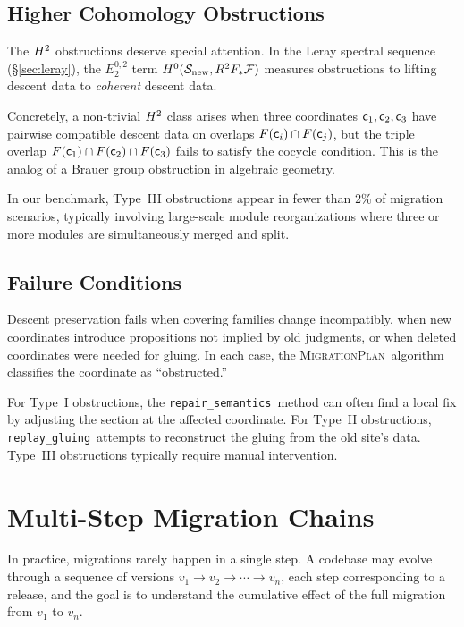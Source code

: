 \documentclass[11pt]{article}
\newcommand{\MigPlan}{\textsc{MigrationPlan}}
\newcommand{\ReplayGlue}{\texttt{replay\_gluing}}
\newcommand{\RepairSem}{\texttt{repair\_semantics}}
\newcommand{\SiteNew}{\Site_{\mathrm{new}}}
\newcommand{\FunctorF}{F}
\newcommand{\Pushforward}{F_*}
\begin{document}
\subsection{Higher Cohomology Obstructions}\label{sec:higher-obstructions}

The $H^{2}$ obstructions deserve special attention.  In the Leray
spectral sequence (§\ref{sec:leray}), the $E_2^{0,2}$ term
$\Hcoh{0}(\SiteNew, R^2\Pushforward\mathcal{F})$ measures obstructions to
lifting descent data to \emph{coherent} descent data.

Concretely, a non-trivial $H^{2}$ class arises when three coordinates
$\mathsf{c}_1, \mathsf{c}_2, \mathsf{c}_3$ have pairwise compatible descent data on
overlaps $\overlap{\FunctorF(\coord_i)}{\FunctorF(\coord_j)}$, but the
triple overlap $\FunctorF(\coord_1) \cap \FunctorF(\coord_2) \cap
\FunctorF(\coord_3)$ fails to satisfy the cocycle condition.  This is the
analog of a Brauer group obstruction in algebraic geometry.

In our benchmark, Type~III obstructions appear in fewer than 2\% of
migration scenarios, typically involving large-scale module reorganizations
where three or more modules are simultaneously merged and split.

\subsection{Failure Conditions}
Descent preservation fails when covering families change incompatibly,
when new coordinates introduce propositions not implied by old judgments,
or when deleted coordinates were needed for gluing.  In each case, the
\MigPlan\ algorithm classifies the coordinate as ``obstructed.''

For Type~I obstructions, the \RepairSem\ method can often find a local
fix by adjusting the section at the affected coordinate.  For Type~II
obstructions, \ReplayGlue\ attempts to reconstruct the gluing from the
old site's data.  Type~III obstructions typically require manual
intervention.

\section{Multi-Step Migration Chains}\label{sec:chains}

In practice, migrations rarely happen in a single step.  A codebase may
evolve through a sequence of versions $v_1 \to v_2 \to \cdots \to v_n$,
each step corresponding to a release, and the goal is to understand the
cumulative effect of the full migration from $v_1$ to $v_n$.
\end{document}
